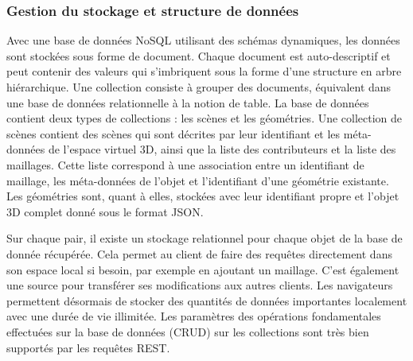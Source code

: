 \subsubsection{Gestion du stockage et structure de données}

Avec une base de données NoSQL utilisant des schémas dynamiques, les 
données sont stockées sous forme de document. Chaque document est 
auto-descriptif et peut contenir des valeurs qui s'imbriquent sous la forme d'une 
structure en arbre hiérarchique. Une collection consiste à grouper des documents, 
équivalent dans une base de données relationnelle à la notion de table. La base de 
données contient deux types de collections : les scènes et les géométries. Une 
collection de scènes contient des scènes qui sont décrites par leur identifiant et 
les méta-données de l'espace virtuel \gls{3D}, ainsi que la liste des contributeurs et 
la 
liste des maillages. Cette liste correspond à une association entre un identifiant de 
maillage, les méta-données de l'objet et l'identifiant d'une géométrie existante. 
Les géométries sont, quant à elles, stockées avec leur identifiant propre et l'objet 
3D complet donné sous le format \gls{JSON}.

Sur chaque pair, il existe un stockage relationnel pour 
chaque objet de la base de donnée récupérée. Cela permet au client de faire des 
requêtes directement dans son espace local si besoin, par exemple en ajoutant un maillage. 
C'est également une source pour transférer ses modifications aux autres clients.
Les navigateurs permettent désormais de stocker des quantités de données 
importantes localement avec une durée de vie illimitée. 
Les paramètres des opérations fondamentales effectuées sur la base de données 
(\gls{CRUD}) sur les collections sont très bien supportés par les requêtes 
\gls{REST}.



%
%
%
%
%

